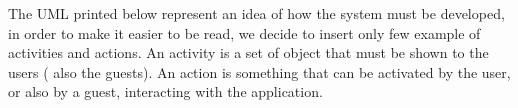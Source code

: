 The UML printed below represent an idea of how the system must be developed, in order to make it easier to be read,
we decide to insert only few example of activities and actions.
An activity is a set of object that must be shown to the users ( also the guests).
An action is something that can be activated by the user, or also by a guest, interacting with the application.
